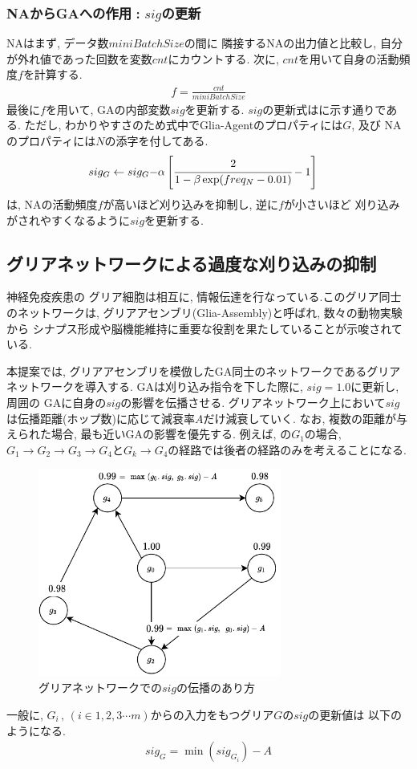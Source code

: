 \documentclass[a4paper, 10.5pt,twocolumn,dvipdfmx]{jsarticle}
\begin{document}
\subsubsection{NAからGAへの作用\,\,:\,\,$sig$の更新}
NAはまず, データ数$miniBatchSize$の間に
隣接するNAの出力値と比較し, 自分が外れ値であった回数を変数$cnt$にカウントする.
次に, $cnt$を用いて自身の活動頻度$f$を計算する.
\begin{align}
  f=\displaystyle\frac{cnt}{miniBatchSize}
\end{align}
最後に$f$を用いて, GAの内部変数$sig$を更新する.
$sig$の更新式はに示す通りである. 
ただし, わかりやすさのため式中でGlia-Agentのプロパティには$G$, 及び
NAのプロパティには$N$の添字を付してある.
\begin{align}
  sig_G\leftarrow sig_G-&\alpha\left[\cfrac{2}{1-\beta\exp(freq_N-0.01)}-1\right]
  \label{eq:sig}
\end{align}
は, NAの活動頻度$f$が高いほど刈り込みを抑制し, 逆に$f$が小さいほど
刈り込みがされやすくなるように$sig$を更新する.
\subsection{グリアネットワークによる過度な刈り込みの抑制}
神経免疫疾患の
グリア細胞は相互に, 情報伝達を行なっている.このグリア同士のネットワークは, 
グリアアセンブリ(Glia-Assembly)と呼ばれ, 数々の動物実験から
シナプス形成や脳機能維持に重要な役割を果たしていることが示唆されている. 

本提案では, グリアアセンブリを模倣したGA同士のネットワークであるグリアネットワークを導入する.
GAは刈り込み指令を下した際に, $sig=1.0$に更新し, 周囲の
GAに自身の$sig$の影響を伝播させる. 
グリアネットワーク上において$sig$は伝播距離(ホップ数)に応じて減衰率$A$だけ減衰していく.
なお, 複数の距離が与えられた場合, 最も近いGAの影響を優先する.
例えば, の$G_1$の場合, 
$G_1\rightarrow G_2\rightarrow G_3\rightarrow G_4$と$G_k\rightarrow G_4$の経路では後者の経路のみを考えることになる.
\vspace{-1.5zh}
\begin{figure}[H]
  \centering
  \includegraphics[width=8cm]{GliaNetworks.pdf}
  \caption{グリアネットワークでの$sig$の伝播のあり方}
  \label{fig:GliaNetworks}
\end{figure}
\vspace{-2zh}
一般に, $G_i \,,\,(i\in 1,2,3\cdots m)$からの入力をもつグリア$G$の$sig$の更新値は
以下のようになる.
\begin{align}
  sig_{G}=\min(sig_{G_i})-A
\end{align}
\end{document}
